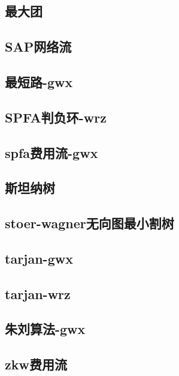 \documentclass[titlepage,a4paper,10pt]{article}
\begin{document}
\begin{spacing}{0.8}
			\subsection{最大团}
				
			\subsection{SAP网络流}
				
			\subsection{最短路-gwx}
				
			\subsection{SPFA判负环-wrz}
				
			\subsection{spfa费用流-gwx}
				
			\subsection{斯坦纳树}
				
			\subsection{stoer-wagner无向图最小割树}
				
			\subsection{tarjan-gwx}
				
			\subsection{tarjan-wrz}
				
			\subsection{朱刘算法-gwx}
				
			\subsection{zkw费用流}
				

\end{spacing}
\end{document}
